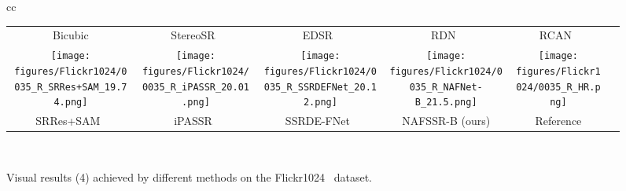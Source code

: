 \documentclass[10pt,twocolumn,letterpaper]{article}
\begin{document}
\begin{figure*}[t]
\begin{tabular}{cc}
\begin{adjustbox}{valign=t}
\begin{tabular}{cccccc}
Bicubic \hspace{-4mm} &
StereoSR~\cite{jeon2018enhancing} \hspace{-4mm} &
EDSR~\cite{lim2017enhanced} \hspace{-4mm} &
RDN~\cite{zhang2018residual} \hspace{-4mm} &
RCAN~\cite{zhang2018image} \hspace{-4mm}
\\

\texttt{[image: figures/Flickr1024/0035\_R\_SRRes+SAM\_19.74.png]} \hspace{-4mm} &
\texttt{[image: figures/Flickr1024/0035\_R\_iPASSR\_20.01.png]} \hspace{-4mm} &
\texttt{[image: figures/Flickr1024/0035\_R\_SSRDEFNet\_20.12.png]} \hspace{-4mm} &
\texttt{[image: figures/Flickr1024/0035\_R\_NAFNet-B\_21.5.png]} \hspace{-4mm}   &
\texttt{[image: figures/Flickr1024/0035\_R\_HR.png]} \hspace{-4mm} 
\\ 

SRRes+SAM~\cite{ying2020stereo} \hspace{-4mm} &
iPASSR~\cite{wang2021symmetric} \hspace{-4mm} &
SSRDE-FNet~\cite{dai2021feedback}  \hspace{-4mm} &
NAFSSR-B (ours) \hspace{-4mm} &
Reference \hspace{-4mm} 
\\
\end{tabular}
\end{adjustbox}
\vspace{1mm}
\\
\end{tabular}
\vspace{-3mm}
\caption{Visual results (4) achieved by different methods on the  Flickr1024~\cite{wang2019learning} dataset. 
}
\label{fig:flickr1024}
\vspace{-3mm}
\end{figure*} 
\end{document}
